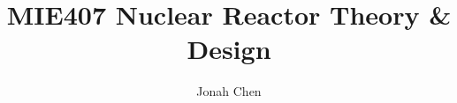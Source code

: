 \documentclass[a4paper]{article}
\title{MIE407 Nuclear Reactor Theory \& Design}
\author{Jonah Chen}
\date{}
\begin{document}
\maketitle
\sffamily
\end{document}
